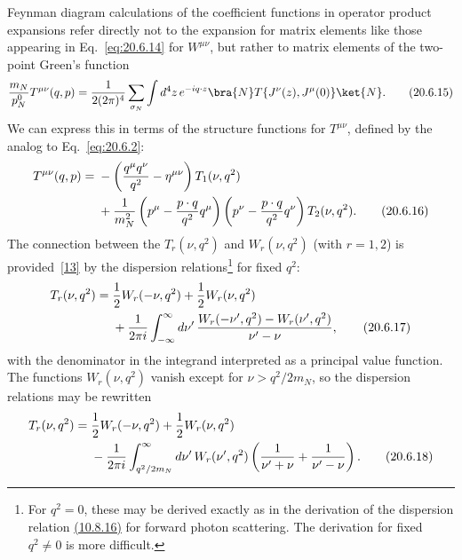 Feynman diagram calculations of the coefficient functions in operator product expansions refer directly not to the expansion for matrix elements like those appearing in Eq.~\eqref{eq:20.6.14} for $W^{\mu\nu}$, but rather to matrix elements of the two-point Green's function
\begin{equation}
\frac{m_N}{p_N^0}T^{\mu\nu}(q,p)
=\frac{1}{2(2\pi)^4}\sum_{\sigma_N}
\int d^4z\,e^{-iq\cdot z}
\bra{N}T\{J^\nu(z),J^\mu(0)\}\ket{N}.
\tag{20.6.15}\label{eq:20.6.15}
\end{equation}
We can express this in terms of the structure functions for $T^{\mu\nu}$, defined by the analog to Eq.~\eqref{eq:20.6.2}:
\begin{align}
T^{\mu\nu}(q,p)
={}&-\left(\frac{q^\mu q^\nu}{q^2}-\eta^{\mu\nu}\right)
T_1(\nu,q^2)
\notag\\
&+\frac{1}{m_N^2}
\left(p^\mu-\frac{p\cdot q}{q^2}q^\mu\right)
\left(p^\nu-\frac{p\cdot q}{q^2}q^\nu\right)
T_2(\nu,q^2).
\tag{20.6.16}\label{eq:20.6.16}
\end{align}
The connection between the $T_r(\nu,q^2)$ and $W_r(\nu,q^2)$ (with $r=1,2$) is provided~\hyperref[ch20-ref-13]{[13]} by the dispersion relations\footnote{For $q^2=0$, these may be derived exactly as in the derivation of the dispersion relation \hyperref[eq:10.8.16]{(10.8.16)} for forward photon scattering. The derivation for fixed $q^2\ne0$ is more difficult.} for fixed $q^2$:
\begin{align}
T_r(\nu,q^2)
={}&\frac12W_r(-\nu,q^2)+\frac12W_r(\nu,q^2)
\notag\\
&+\frac{1}{2\pi i}\int_{-\infty}^{\infty}d\nu'\,
\frac{W_r(-\nu',q^2)-W_r(\nu',q^2)}
{\nu'-\nu},
\tag{20.6.17}\label{eq:20.6.17}
\end{align}
with the denominator in the integrand interpreted as a principal value function. The functions $W_r(\nu,q^2)$ vanish except for $\nu>q^2/2m_N$, so the dispersion relations may be rewritten
\begin{align}
T_r(\nu,q^2)
={}&\frac12W_r(-\nu,q^2)+\frac12W_r(\nu,q^2)
\notag\\
&-\frac{1}{2\pi i}\int_{q^2/2m_N}^{\infty}d\nu'\,
W_r(\nu',q^2)
\left(\frac{1}{\nu'+\nu}+\frac{1}{\nu'-\nu}\right).
\tag{20.6.18}\label{eq:20.6.18}
\end{align}

